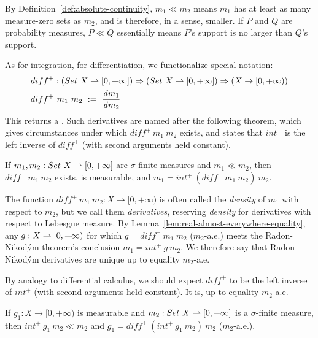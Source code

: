 By Definition~\ref{def:absolute-continuity}, $m_1 \ll m_2$ means $m_1$ has at least as many measure-zero sets as $m_2$, and is therefore, in a sense, smaller.
If $P$ and $Q$ are probability measures, $P \ll Q$ essentially means $P$'s support is no larger than $Q$'s support.

As for integration, for differentiation, we functionalize special notation:
\begin{equation}
\begin{aligned}
	&diff^+ : (Set~X \rightharpoonup [0,+\infty]) \Rightarrow (Set~X \rightharpoonup [0,+\infty]) \Rightarrow (X \to [0,+\infty)) \\
	&diff^+~m_1~m_2\ :=\ \frac{\mathit{d}m_1}{\mathit{d}m_2}
\end{aligned}
\label{eqn:int-diff-types}
\end{equation}
This returns a .
Such derivatives are named after the following theorem, which gives circumstances under which $diff^+~m_1~m_2$ exists, and states that $int^+$ is the left inverse of $diff^+$ (with second arguments held constant).

\begin{lemma}
\label{lem:radon-nikodym}
If $m_1,m_2 : Set~X \rightharpoonup [0,+\infty]$ are $\sigma$-finite measures and $m_1 \ll m_2$, then $diff^+~m_1~m_2$ exists, is measurable, and $m_1 = int^+~(diff^+~m_1~m_2)~m_2$.
\end{lemma}

The function $diff^+~m_1~m_2 : X \to [0,+\infty)$ is often called the \emph{density} of $m_1$ with respect to $m_2$, but we call them \emph{derivatives}, reserving \emph{density} for derivatives with respect to Lebesgue measure.
By Lemma~\ref{lem:real-almost-everywhere-equality}, any $g : X \rightharpoonup [0,+\infty)$ for which $g = diff^+~m_1~m_2$ ($m_2$-a.e.) meets the Radon-Nikod\'ym theorem's conclusion $m_1 = int^+~g~m_2$.
We therefore say that Radon-Nikod\'ym derivatives are unique up to equality $m_2$-a.e.

By analogy to differential calculus, we should expect $diff^+$ to be the left inverse of $int^+$ (with second arguments held constant).
It is, up to equality $m_2$-a.e.
\begin{lemma}
\label{lem:diff-left-inverse-int}
If $g_1 : X \to [0,+\infty)$ is measurable and $m_2 : Set~X \rightharpoonup [0,+\infty]$ is a $\sigma$-finite measure, then $int^+~g_1~m_2 \ll m_2$ and $g_1 = diff^+~(int^+~g_1~m_2)~m_2$ ($m_2$-a.e.).
\end{lemma}
\begin{comment}
\begin{proof}
\begin{align*}
	&int~(f_1 - diff^+~(int^+~f_1~m_2)~m_2)~m_2
\\
	&\tab=\ int~f_1~m_2 - int~(diff^+~(int^+~f_1~m_2)~m_2)~m_2
\\
	&\tab=\ int^+~f_1~m_2 - int^+~(diff^+~(int^+~f_1~m_2)~m_2)~m_2
\\
	&\tab=\ int^+~f_1~m_2 - int^+~f_1~m_2
\end{align*}
\end{proof}
\end{comment}

